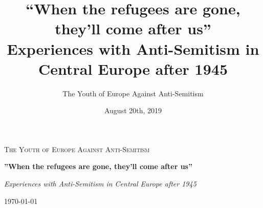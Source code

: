 \documentclass{book}
\title{``When the refugees are gone, they'll come after us''\\ Experiences with Anti-Semitism in Central Europe after 1945}
\author{The Youth of Europe Against Anti-Semitism}
\date{August 20th, 2019}
\begin{document}
	\setlength{\parindent}{0pt}
	\setlength{\parskip}{1em}
\begin{titlepage}
	\centering
	{\scshape\LARGE The Youth of Europe
	Against Anti-Semitism \par}
	\vspace{1cm}
	{\huge\bfseries''When the refugees are gone, they'll come after us'' \par}
	\vspace{2cm}
	{\Large\itshape Experiences with Anti-Semitism in Central Europe after 1945\par}
	\vfill
	{\large\today\par}
\end{titlepage}
\thispagestyle{empty}
\tableofcontents


















 








\nocite{*}
\printbibliography
\end{document}

